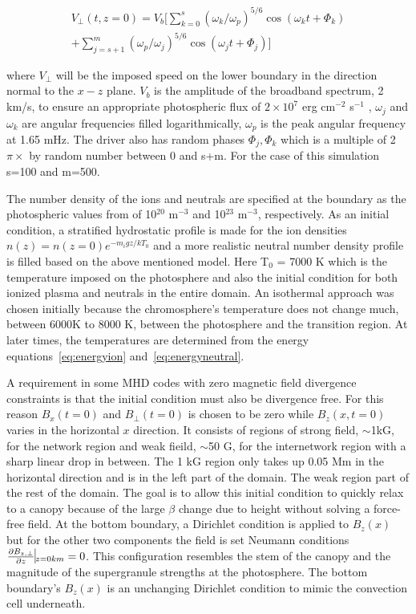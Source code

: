 \documentclass[12pt,upcase]{umlthesis}
\begin{document}
\begin{equation}
\begin{aligned}
	V_{\perp} (t, z=0) = V_b [ \sum_{k=0}^s {(\omega_k/\omega_p)}^{5/6} \cos{(\omega_k t + \Phi_k)} \\
	+ \sum_{j=s+1}^m {(\omega_p/\omega_j)}^{5/6} \cos{(\omega_j t + \Phi_j)} ]
\end{aligned}
\end{equation}

where $V_{\perp}$ will be the imposed speed on the lower boundary in the direction normal to the $x-z$ plane. $V_b$ is the amplitude of the broadband spectrum, 2 km/s, to ensure an appropriate photospheric flux of $2 \times 10^7$ erg cm$^{-2}$ s$^{-1}$ \citep[see][section 3.2]{Tu2013}, $\omega_j$ and $\omega_k$ are angular frequencies filled logarithmically, $\omega_p$ is the peak angular frequency at 1.65 mHz. The driver also has random phases $\Phi_j, \Phi_k$ which is a multiple of 2$\pi \times$ by random number between 0 and s+m. For the case of this simulation s=100 and m=500. 

The number density of the ions and neutrals are specified at the boundary as the photospheric values from \citet{AvrettLoeser2008} of 10$^{20}$ m$^{-3}$ and 10$^{23}$ m$^{-3}$, respectively. As an initial condition, a stratified hydrostatic profile is made for the ion densities $n(z) = n(z=0) e^{-m_{i}gz/kT_0}$ and a more realistic neutral number density profile is filled based on the above mentioned model. Here T$_0$ = 7000 K which is the temperature imposed on the photosphere and also the initial condition for both ionized plasma and neutrals in the entire domain. An isothermal approach was chosen initially because the chromosphere's temperature does not change much, between 6000K to 8000 K, between the photosphere and the transition region. At later times, the temperatures are determined from the energy equations~\ref{eq:energyion} and~\ref{eq:energyneutral}. 

A requirement in some MHD codes with zero magnetic field divergence constraints is that the initial condition must also be divergence free. For this reason $B_x(t=0)$ and $B_\perp(t=0)$ is chosen to be zero while $B_z(x, t=0)$ varies in the horizontal $x$ direction. It consists of regions of strong field, $\sim$1kG, for the network region and weak fieild, $\sim$50 G, for the internetwork region with a sharp linear drop in between. The 1 kG region only takes up 0.05 Mm in the horizontal direction and is in the left part of the domain. The weak region part of the rest of the domain. The goal is to allow this initial condition to quickly relax to a canopy because of the large $\beta$ change due to height without solving a force-free field. At the bottom boundary,  a Dirichlet condition is applied to $B_z(x)$ but for the other two components the field is set Neumann conditions $\frac{\partial B_{z,\perp}}{\partial z}\vline_{z=0km} = 0$. This configuration resembles the stem of the canopy and the magnitude of the supergranule strengths at the photosphere. The bottom boundary's $B_z(x)$ is an unchanging Dirichlet condition to mimic the convection cell underneath.
\end{document}
